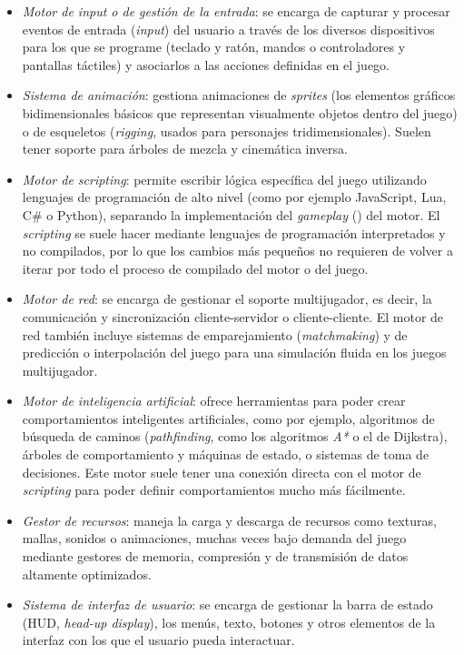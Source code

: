 \begin{itemize}
\item \textit{Motor de input o de gestión de la entrada}: se encarga de capturar y procesar eventos de entrada (\textit{input}) del usuario a través de los diversos dispositivos para los que se programe (teclado y ratón, mandos o controladores y pantallas táctiles) y asociarlos a las acciones definidas en el juego.
\item \textit{Sistema de animación}: gestiona animaciones de \textit{sprites} (los elementos gráficos bidimensionales básicos que representan visualmente objetos dentro del juego) o de esqueletos (\textit{rigging}, usados para personajes tridimensionales). Suelen tener soporte para árboles de mezcla y cinemática inversa.
\item \textit{Motor de scripting}: permite escribir lógica específica del juego utilizando lenguajes de programación de alto nivel (como por ejemplo JavaScript, Lua, C\# o Python), separando la implementación del \textit{gameplay} () del motor. El \textit{scripting} se suele hacer mediante lenguajes de programación interpretados y no compilados, por lo que los cambios más pequeños no requieren de volver a iterar por todo el proceso de compilado del motor o del juego.
\item \textit{Motor de red}: se encarga de gestionar el soporte multijugador, es decir, la comunicación y sincronización cliente-servidor o cliente-cliente. El motor de red también incluye sistemas de emparejamiento (\textit{matchmaking}) y de predicción o interpolación del juego para una simulación fluida en los juegos multijugador.
\item \textit{Motor de inteligencia artificial}: ofrece herramientas para poder crear comportamientos inteligentes artificiales, como por ejemplo, algoritmos de búsqueda de caminos (\textit{pathfinding}, como los algoritmos \textit{A*} o el de Dijkstra), árboles de comportamiento y máquinas de estado, o sistemas de toma de decisiones. Este motor suele tener una conexión directa con el motor de \textit{scripting} para poder definir comportamientos mucho más fácilmente.
\item \textit{Gestor de recursos}: maneja la carga y descarga de recursos como texturas, mallas, sonidos o animaciones, muchas veces bajo demanda del juego mediante gestores de memoria, compresión y de transmisión de datos altamente optimizados.
\item \textit{Sistema de interfaz de usuario}: se encarga de gestionar la barra de estado (HUD, \textit{head-up display}), los menús, texto, botones y otros elementos de la interfaz con los que el usuario pueda interactuar.
\end{itemize}

